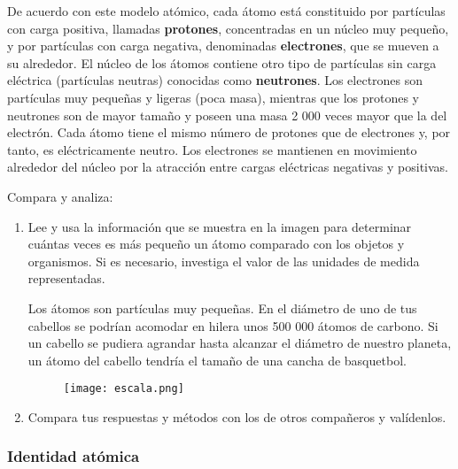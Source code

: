 De acuerdo con este modelo atómico, cada átomo está constituido por partículas
con carga positiva, llamadas \textbf{protones}, concentradas en un núcleo muy pequeño, y por
partículas con carga negativa, denominadas \textbf{electrones}, que se mueven a su alrededor.
El núcleo de los átomos contiene otro tipo de partículas sin carga eléctrica (partículas
neutras) conocidas como \textbf{neutrones}. Los electrones son partículas muy pequeñas y
ligeras (poca masa), mientras que los protones y neutrones son de mayor tamaño y
poseen una masa 2 000 veces mayor que la del electrón. Cada átomo tiene el mismo
número de protones que de electrones y, por tanto, es eléctricamente neutro. Los electrones
se mantienen en movimiento alrededor del núcleo por la atracción entre cargas
eléctricas negativas y positivas.


\begin{boxK}
    Compara y analiza:\\
    \begin{enumerate}
        \item Lee y usa la información que se muestra en la imagen para determinar cuántas
              veces es más pequeño un átomo comparado con los objetos y organismos. Si es
              necesario, investiga el valor de las unidades de medida representadas.
              \begin{boxF}
                  Los átomos son partículas muy pequeñas. En el diámetro de uno de tus cabellos se podrían
                  acomodar en hilera unos 500 000 átomos de carbono. Si un cabello se pudiera agrandar
                  hasta alcanzar el diámetro de nuestro planeta, un átomo del cabello tendría el tamaño de
                  una cancha de basquetbol.
              \end{boxF}

              \begin{figure}[H]
                  \centering
                  \texttt{[image: escala.png]}
              \end{figure}


        \item Compara tus respuestas y métodos con los de otros compañeros y valídenlos.
    \end{enumerate}
\end{boxK}
\newpage

\subsubsection{Identidad atómica}

